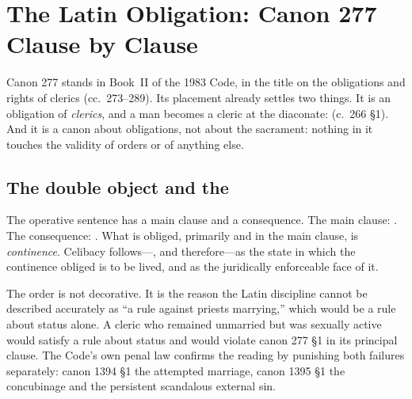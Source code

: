 \section{The Latin Obligation: Canon 277 Clause by Clause}

Canon 277 stands in Book~II of the 1983 Code, in the title on the obligations and rights of clerics (cc.~273--289). Its placement already settles two things. It is an obligation of \emph{clerics}, and a man becomes a cleric at the diaconate:  (c.~266 §1). And it is a canon about obligations, not about the sacrament: nothing in it touches the validity of orders or of anything else.

\subsection{The double object and the }

The operative sentence has a main clause and a consequence. The main clause: . The consequence: . What is obliged, primarily and in the main clause, is \emph{continence}. Celibacy follows---, and therefore---as the state in which the continence obliged is to be lived, and as the juridically enforceable face of it.

The order is not decorative. It is the reason the Latin discipline cannot be described accurately as ``a rule against priests marrying,'' which would be a rule about status alone. A cleric who remained unmarried but was sexually active would satisfy a rule about status and would violate canon 277 §1 in its principal clause. The Code's own penal law confirms the reading by punishing both failures separately: canon 1394 §1 the attempted marriage, canon 1395 §1 the concubinage and the persistent scandalous external sin.

